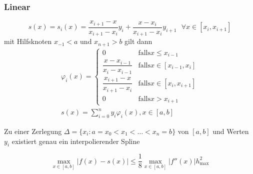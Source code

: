 \documentclass[
	ngerman,
	accentcolor=9c,%
	type=intern,
	marginpar=false
	]{tudapub}
\begin{document}
            \subsubsection{Linear}
                \begin{equation*}
                    s(x) = s_i(x) = \dfrac{x_{i+1} - x}{x_{i+1} - x_i} y_i + \dfrac{x - x_{i}}{x_{i+1} - x_i} y_{i+1} \mbox{ }\forall x \in [x_i, x_{i+1}]
                \end{equation*}
                mit Hilfsknoten $x_{-1} < a $ und $ x_{n+1} > b$ gilt dann
                \begin{align*}
                    \varphi_i(x) =
                    \begin{cases}
                        0 & \mbox{falls} x \leq x_{i-1}\\
                        \dfrac{x - x_{i-1}}{x_{i} - x_{i-1}}& \mbox{falls} x \in [x_{i-1}, x_i]\\
                        \dfrac{x_{i+1} - x}{x_{i+1} - x_i}& \mbox{falls} x \in [x_{i}, x_{i+1}]\\
                        0 & \mbox{falls} x > x_{i+1}
                    \end{cases} \\
                    s(x) = \sum_{i=0}^n y_i \varphi_i(x), x \in [a,b]
                \end{align*}
                \begin{satz}
                    Zu einer Zerlegung $\Delta = \{x_i:a = x_0 < x_1 < \dots < x_n = b\}$ von $[a,b]$ und Werten $y_i$ existiert genau ein interpolierender Spline
                \end{satz}
                \begin{satz}
                    \begin{equation*}
                        \max_{x \in [a,b]} |f(x) - s(x)| \leq \dfrac{1}{8} \max_{x \in [a,b]} | f''(x)| h_{\mbox{max}}^2
                    \end{equation*}
                \end{satz} 
\end{document}
